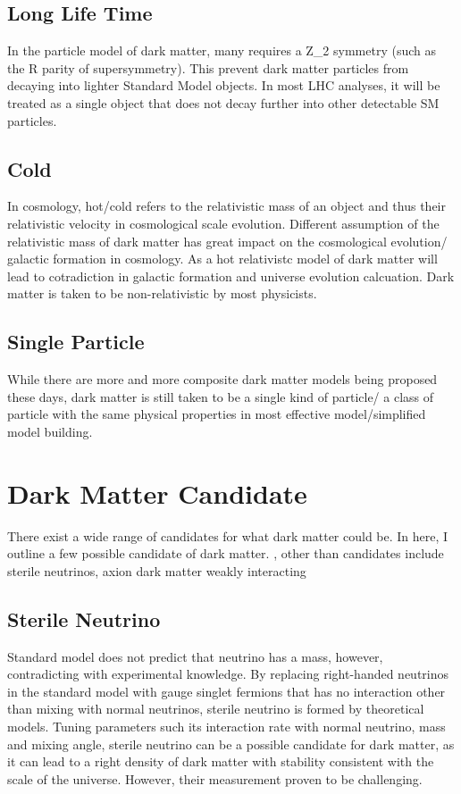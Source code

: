 \subsection{Long Life Time}
In the particle model of dark matter, many requires a Z_2 symmetry (such as the R parity of supersymmetry). This prevent dark matter particles from decaying into lighter Standard Model objects. In most LHC analyses, it will be treated as a single object that does not decay further into other detectable SM particles. 

\subsection{Cold}
In cosmology, hot/cold refers to the relativistic mass of an object and thus their relativistic velocity in cosmological scale evolution. Different assumption of the relativistic mass of dark matter has great impact on the cosmological evolution/ galactic formation in cosmology.
As a hot relativistc model of dark matter will lead to cotradiction in galactic formation and universe evolution calcuation. Dark matter is taken to be non-relativistic by most physicists. 

\subsection{Single Particle}
While there are more and more composite dark matter models being proposed these days, dark matter is still taken to be a single kind of particle/ a class of particle with the same physical properties in most effective model/simplified model building. 

\section{Dark Matter Candidate}

There exist a wide range of candidates for what dark matter could be. In here, I outline a few possible candidate of dark matter. , other than candidates include sterile neutrinos, axion dark matter weakly interacting  

\subsection{Sterile Neutrino}
Standard model does not predict that neutrino has a mass, however, contradicting with experimental knowledge. By replacing right-handed neutrinos in the standard model with gauge singlet fermions that has no interaction other than mixing with normal neutrinos, sterile neutrino is formed by theoretical models. Tuning parameters such its interaction rate with normal neutrino, mass and mixing angle, sterile neutrino can be a possible candidate for dark matter, as it can lead to a right
density of dark matter with stability consistent with the scale of the universe. 
However, their measurement proven to be challenging. 


